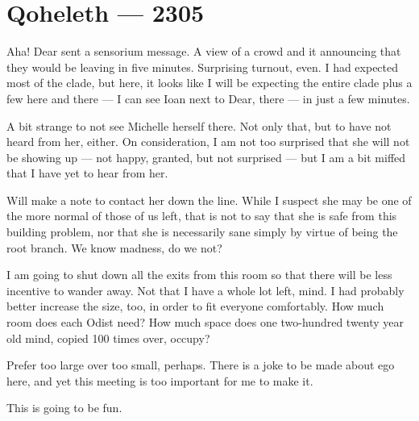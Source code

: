 \hypertarget{qoheleth-2305}{%
\chapter*{Qoheleth — 2305}\label{qoheleth-2305}}

Aha! Dear sent a sensorium message. A view of a crowd and it announcing that they would be leaving in five minutes. Surprising turnout, even. I had expected most of the clade, but here, it looks like I will be expecting the entire clade plus a few here and there — I can see Ioan next to Dear, there — in just a few minutes.

A bit strange to not see Michelle herself there. Not only that, but to have not heard from her, either. On consideration, I am not too surprised that she will not be showing up — not happy, granted, but not surprised — but I am a bit miffed that I have yet to hear from her.

Will make a note to contact her down the line. While I suspect she may be one of the more normal of those of us left, that is not to say that she is safe from this building problem, nor that she is necessarily sane simply by virtue of being the root branch. We know madness, do we not?

I am going to shut down all the exits from this room so that there will be less incentive to wander away. Not that I have a whole lot left, mind. I had probably better increase the size, too, in order to fit everyone comfortably. How much room does each Odist need? How much space does one two-hundred twenty year old mind, copied 100 times over, occupy?

Prefer too large over too small, perhaps. There is a joke to be made about ego here, and yet this meeting is too important for me to make it.

This is going to be fun.
